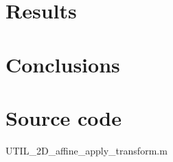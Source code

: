 \section{Results}

\section{Conclusions}


\newpage
\appendix
\section{Source code}
\label{Sec:sourceCode}
\scriptsize

		{UTIL_2D_affine_apply_transform.m}

\normalsize


